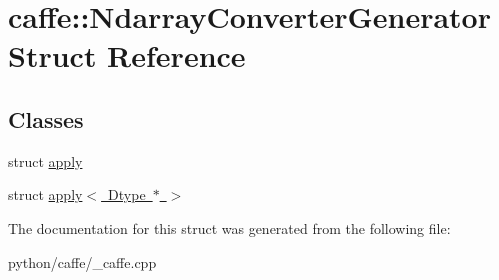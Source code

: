 \hypertarget{structcaffe_1_1_ndarray_converter_generator}{}\section{caffe\+:\+:Ndarray\+Converter\+Generator Struct Reference}
\label{structcaffe_1_1_ndarray_converter_generator}
\subsection*{Classes}
\begin{DoxyCompactItemize}
\item 
struct \mbox{\hyperlink{structcaffe_1_1_ndarray_converter_generator_1_1apply}{apply}}
\item 
struct \mbox{\hyperlink{structcaffe_1_1_ndarray_converter_generator_1_1apply_3_01_dtype_01_5_01_4}{apply$<$ Dtype $\ast$ $>$}}
\end{DoxyCompactItemize}


The documentation for this struct was generated from the following file\+:\begin{DoxyCompactItemize}
\item 
python/caffe/\+\_\+caffe.\+cpp\end{DoxyCompactItemize}

